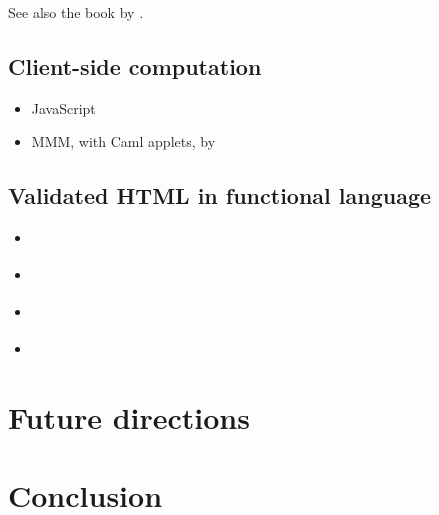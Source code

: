 \documentclass{acm_proc_article-sp}
\begin{document}
See also the book by \citet{greenspun99panda}.

\subsection{Client-side computation}
\label{sec:related-client}
\begin{itemize}
\item JavaScript \cite{ecmascript99,flanagan01javascript}
\item MMM, with Caml applets, by \citet{rouaix96web}
\end{itemize}

\subsection{Validated HTML in functional language}
\begin{itemize}
\item \citet{elsman04typing}
\item \citet{wallace99haxml}
\item \citet{ohl04xhtml}
\item \citet{hosoya03xduce}
\end{itemize}

\section{Future directions}

\section{Conclusion}



\end{document}
